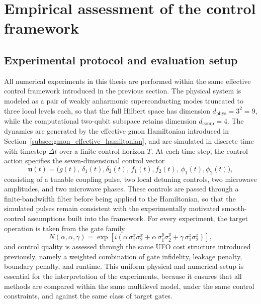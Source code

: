 \chapter{Empirical assessment of the control framework}
\section{Experimental protocol and evaluation setup}
\label{subsec:experimental_protocol_setup}

All numerical experiments in this thesis are performed within the same effective control framework introduced in the previous section. The physical system is modeled as a pair of weakly anharmonic superconducting modes truncated to three local levels each, so that the full Hilbert space has dimension
\(d_{\mathrm{phys}} = 3^2 = 9\),
while the computational two-qubit subspace retains dimension
\(d_{\mathrm{comp}} = 4\).
The dynamics are generated by the effective gmon Hamiltonian introduced in Section~\ref{subsec:gmon_effective_hamiltonian}, and are simulated in discrete time with timestep \(\Delta t\) over a finite control horizon \(T\). At each time step, the control action specifies the seven-dimensional control vector
\begin{equation}
\bm{u}(t)
=
\bigl(
g(t),\,
\delta_1(t),\delta_2(t),\,
f_1(t),f_2(t),\,
\phi_1(t),\phi_2(t)
\bigr),
\label{eq:validation_control_vector}
\end{equation}
consisting of a tunable coupling pulse, two local detuning controls, two microwave amplitudes, and two microwave phases. These controls are passed through a finite-bandwidth filter before being applied to the Hamiltonian, so that the simulated pulses remain consistent with the experimentally motivated smooth-control assumptions built into the framework. For every experiment, the target operation is taken from the gate family
\begin{equation}
N(\alpha,\alpha,\gamma)
=
\exp\!\left[
i\left(
\alpha\,\sigma_1^x\sigma_2^x
+
\alpha\,\sigma_1^y\sigma_2^y
+
\gamma\,\sigma_1^z\sigma_2^z
\right)
\right],
\label{eq:validation_target_family}
\end{equation}
and control quality is assessed through the same UFO cost structure introduced previously, namely a weighted combination of gate infidelity, leakage penalty, boundary penalty, and runtime. This uniform physical and numerical setup is essential for the interpretation of the experiments, because it ensures that all methods are compared within the same multilevel model, under the same control constraints, and against the same class of target gates.


